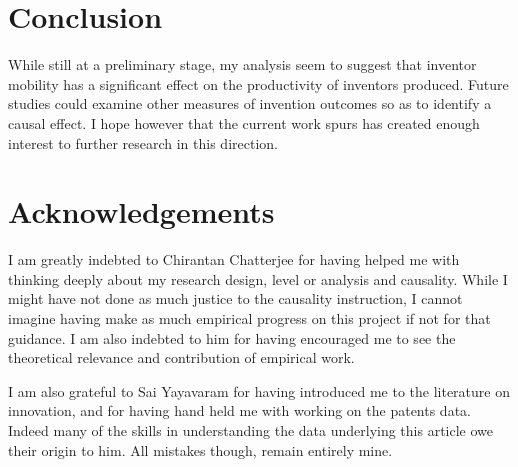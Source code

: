 \documentclass[12pt]{article}
\begin{document}
\section{Conclusion}
While still at a preliminary stage, my analysis seem to suggest that inventor mobility  has a significant effect on the productivity of inventors produced. Future studies could  examine other measures of invention outcomes so as to identify a causal effect. I hope however that the current work spurs has created enough interest to further research in this direction.


\section*{Acknowledgements}
I am greatly indebted to Chirantan Chatterjee for having helped me with thinking deeply about my research design, level or analysis and causality. While I might have not done as much justice to the causality instruction, I cannot imagine having make as much empirical progress on this project if not for that guidance. I am also indebted to him for having encouraged me to see the theoretical relevance and contribution of empirical work.

I am also grateful to Sai Yayavaram for having introduced me to the literature on innovation, and for having hand held me with working on the patents data. Indeed many of the skills in understanding the data underlying this article owe their origin to him. All mistakes though, remain entirely mine.

\newpage
 

\end{document}
